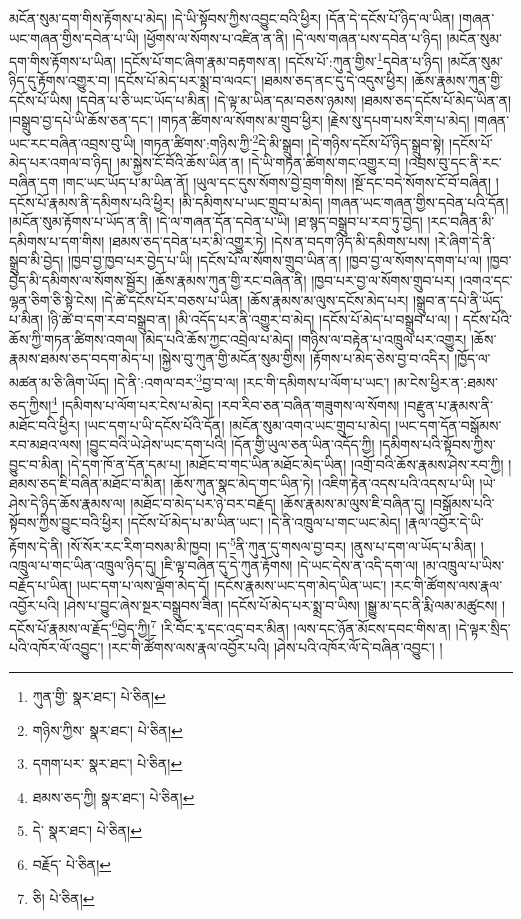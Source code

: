 མངོན་སུམ་དག་གིས་རྟོགས་པ་མེད། །དེ་ཡི་སྟོབས་ཀྱིས་འབྱུང་བའི་ཕྱིར། །དོན་དེ་དངོས་པོ་ཉིད་ལ་ཡིན། །གཞན་ཡང་གཞན་གྱིས་དབེན་པ་ཡི། །ཕྱོགས་ལ་སོགས་པ་འཛིན་ན་ནི། །དེ་ལས་གཞན་པས་དབེན་པ་ཉིད། །མངོན་སུམ་དག་གིས་རྟོགས་པ་ཡིན། །དངོས་པོ་གང་ཞིག་རྣམ་བརྟགས་ན། །དངོས་པོ་:ཀུན་གྱིས་\footnote{ཀུན་གྱི་  སྣར་ཐང་།  པེ་ཅིན། }དབེན་པ་ཉིད། །མངོན་སུམ་ཉིད་དུ་རྟོགས་འགྱུར་བ། །དངོས་པོ་མེད་པར་སྨྲ་བ་ལའང་། །ཐམས་ཅད་ནང་དུ་དེ་འདུས་ཕྱིར། །ཆོས་རྣམས་ཀུན་གྱི་དངོས་པོ་ཡིས། །དབེན་པ་ཅི་ཡང་ཡོད་པ་མིན། །དེ་ལྟ་མ་ཡིན་དམ་བཅས་ཉམས། །ཐམས་ཅད་དངོས་པོ་མེད་ཡིན་ན། །བསྒྲུབ་བྱ་དཔེ་ཡི་ཆོས་ཅན་དང་། །གཏན་ཚིགས་ལ་སོགས་མ་གྲུབ་ཕྱིར། །རྗེས་སུ་དཔག་པས་རིག་པ་མེད། །གཞན་ཡང་རང་བཞིན་འབྲས་བུ་ཡི། །གཏན་ཚིགས་:གཉིས་ཀྱི་\footnote{གཉིས་ཀྱིས་  སྣར་ཐང་།  པེ་ཅིན། }དེ་མི་སྒྲུབ། །དེ་གཉིས་དངོས་པོ་ཉིད་སྒྲུབ་སྟེ། །དངོས་པོ་མེད་པར་འགལ་བ་ཉིད། །མ་སྐྱེས་ངོ་བོའི་ཆོས་ཡིན་ན། །དེ་ཡི་གཏན་ཚིགས་གང་འགྱུར་བ། །འབྲས་བུ་དང་ནི་རང་བཞིན་དག །གང་ཡང་ཡོད་པ་མ་ཡིན་ནོ། །ཡུལ་དང་དུས་སོགས་བྱེ་བྲག་གིས། །སྔོ་དང་བདེ་སོགས་ངོ་བོ་བཞིན། །དངོས་པོ་རྣམས་ནི་དམིགས་པའི་ཕྱིར། །མི་དམིགས་པ་ཡང་གྲུབ་པ་མེད། །གཞན་ཡང་གཞན་གྱིས་དབེན་པའི་དོན། །མངོན་སུམ་རྟོགས་པ་ཡོད་ན་ནི། །དེ་ལ་གཞན་དོན་དབེན་པ་ཡི། །ཐ་སྙད་བསྒྲུབ་པ་རབ་ཏུ་བྱེད། །རང་བཞིན་མི་དམིགས་པ་དག་གིས། །ཐམས་ཅད་དབེན་པར་མི་འགྱུར་ཏེ། །དེས་ན་བདག་ཉིད་མི་དམིགས་པས། །རེ་ཞིག་དེ་ནི་སྒྲུབ་མི་བྱེད། །ཁྱབ་བྱ་ཁྱབ་པར་བྱེད་པ་ཡི། །དངོས་པོ་ལ་སོགས་གྲུབ་ཡིན་ན། །ཁྱབ་བྱ་ལ་སོགས་དགག་པ་ལ། །ཁྱབ་བྱེད་མི་དམིགས་ལ་སོགས་སྦྱོར། །ཆོས་རྣམས་ཀུན་གྱི་རང་བཞིན་ནི། །ཁྱབ་པར་བྱ་ལ་སོགས་གྲུབ་པར། །འགའ་དང་ལྷན་ཅིག་ཅི་སྟེ་ངེས། །དེ་ཚེ་དངོས་པོར་བཅས་པ་ཡིན། །ཆོས་རྣམས་མ་ལུས་དངོས་མེད་པར། །སྒྲུབ་ན་དཔེ་ནི་ཡོད་པ་མིན། །ཉི་ཚེ་བ་དག་རབ་བསྒྲུབ་ན། །མི་འདོད་པར་ནི་འགྱུར་བ་མེད། །དངོས་པོ་མེད་པ་བསྒྲུབ་པ་ལ། །
དངོས་པོའི་ཆོས་ཀྱི་གཏན་ཚིགས་འགལ། །མེད་པའི་ཆོས་ཀྱང་འབྲེལ་པ་མེད། །གཉིས་ལ་བརྟེན་པ་འཁྲུལ་པར་འགྱུར། །ཆོས་རྣམས་ཐམས་ཅད་བདག་མེད་པ། །སྐྱེས་བུ་ཀུན་གྱི་མངོན་སུམ་གྱིས། །རྟོགས་པ་མེད་ཅེས་བྱ་བ་འདིར། །ཁྱོད་ལ་མཚན་མ་ཅི་ཞིག་ཡོད། །དེ་ནི་:འགལ་བར་\footnote{དགག་པར་  སྣར་ཐང་།  པེ་ཅིན། }བྱ་བ་ལ། །རང་གི་དམིགས་པ་ལོག་པ་ཡང་། །མ་ངེས་ཕྱིར་ན་:ཐམས་ཅད་ཀྱིས།\footnote{ཐམས་ཅད་ཀྱི།  སྣར་ཐང་།  པེ་ཅིན། } །དམིགས་པ་ལོག་པར་ངེས་པ་མེད། །རབ་རིབ་ཅན་བཞིན་གཟུགས་ལ་སོགས། །བརྫུན་པ་རྣམས་ནི་མཐོང་བའི་ཕྱིར། །ཡང་དག་པ་ཡི་དངོས་པོའི་དོན། །མངོན་སུམ་འགའ་ཡང་གྲུབ་པ་མེད། །ཡང་དག་དོན་བསྒོམས་རབ་མཐའ་ལས། །བྱུང་བའི་ཡེ་ཤེས་ཡང་དག་པའི། །དོན་གྱི་ཡུལ་ཅན་ཡིན་འདོད་ཀྱི། །དམིགས་པའི་སྟོབས་ཀྱིས་བྱུང་བ་མིན། །དེ་དག་ཁོ་ན་དོན་དམ་པ། །མཐོང་བ་གང་ཡིན་མཐོང་མེད་ཡིན། །འགྲོ་བའི་ཆོས་རྣམས་ཤེས་རབ་ཀྱི། །ཐམས་ཅད་ཇི་བཞིན་མཐོང་བ་མིན། །ཆོས་ཀུན་སྣང་མེད་གང་ཡིན་ཏེ། །འཇིག་རྟེན་འདས་པའི་འདས་པ་ཡི། །ཡེ་ཤེས་དེ་ཉིད་ཆོས་རྣམས་ལ། །མཐོང་བ་མེད་པར་ཉེ་བར་བརྗོད། །ཆོས་རྣམས་མ་ལུས་ཇི་བཞིན་དུ། །བསྒོམས་པའི་སྟོབས་ཀྱིས་བྱུང་བའི་ཕྱིར། །དངོས་པོ་མེད་པ་མ་ཡིན་ཡང་། །དེ་ནི་འཁྲུལ་པ་གང་ཡང་མེད། །རྣལ་འབྱོར་དེ་ཡི་རྟོགས་དེ་ནི། །སོ་སོར་རང་རིག་བསམ་མི་ཁྱབ། །ད་\footnote{དེ་  སྣར་ཐང་།  པེ་ཅིན། }ནི་ཀུན་དུ་གསལ་བྱ་བར། །ནུས་པ་དག་ལ་ཡོད་པ་མིན། །འཁྲུལ་པ་གང་ཡིན་འཁྲུལ་ཉིད་དུ། །ཇི་ལྟ་བཞིན་དུ་དེ་ཀུན་རྟོགས། །དེ་ཡང་དེས་ན་འདི་དག་ལ། །མ་འཁྲུལ་པ་ཡིས་བརྗོད་པ་ཡིན། །ཡང་དག་པ་ལས་ལྡོག་མེད་དོ། །དངོས་རྣམས་ཡང་དག་མེད་ཡིན་ཡང་། །རང་གི་ཚོགས་ལས་རྣལ་འབྱོར་པའི། །ཤེས་པ་བྱུང་ཞེས་སྔར་བསྒྲུབས་ཟིན། །དངོས་པོ་མེད་པར་སྨྲ་བ་ཡིས། །སྒྱུ་མ་དང་ནི་རྨི་ལམ་མཚུངས། །དངོས་པོ་རྣམས་ལ་རྗོད་\footnote{བརྗོད་  པེ་ཅིན། }བྱེད་ཀྱི།\footnote{ཅི།  པེ་ཅིན། } །རི་བོང་རྭ་དང་འདྲ་བར་མིན། །ལས་དང་ཉོན་མོངས་དབང་གིས་ན། །དེ་ལྟར་སྲིད་པའི་འཁོར་ལོ་འབྱུང་། །རང་གི་ཚོགས་ལས་རྣལ་འབྱོར་པའི། །ཤེས་པའི་འཁོར་ལོ་དེ་བཞིན་འབྱུང་། །
